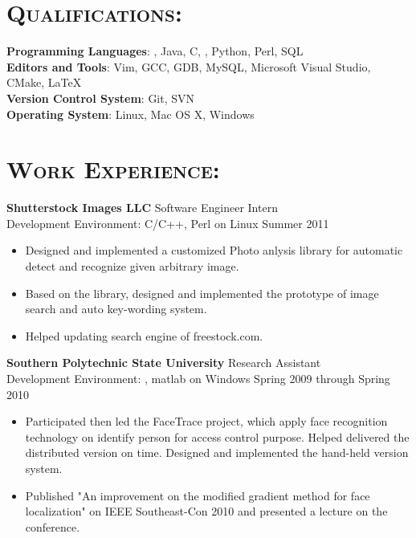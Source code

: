 \begin{resume}
\section{\textsc{Qualifications:}}

\textbf{\newline Programming Languages}: \Cplusplus, Java, C, \CSharp, Python, Perl, SQL \\
\textbf{Editors and Tools}: Vim, GCC, GDB, MySQL, Microsoft Visual Studio, CMake, \LaTeX \\
\textbf{Version Control System}: Git, SVN \\
\textbf{Operating System}: Linux, Mac OS X, Windows 


\section{\textsc{Work Experience:}}
\textbf{\newline Shutterstock Images LLC} \hfill Software Engineer Intern\\
Development Environment: C/C++, Perl on Linux \hfill Summer 2011
\begin{itemize}
    \item Designed and implemented a customized Photo anlysis library for automatic detect and recognize given arbitrary image.
    \item Based on the library, designed and implemented the prototype of image search and auto key-wording system.
    \item Helped updating search engine of freestock.com.
\end{itemize}


\textbf{Southern Polytechnic State University} \hfill Research Assistant\\
Development Environment: \CSharp, matlab on Windows \hfill Spring 2009 through Spring 2010 
\begin{itemize}
 	\item Participated then led the FaceTrace project, which apply face recognition
technology on identify person for access control purpose.
Helped delivered the distributed version on time.
Designed and implemented the hand-held version system.    
    \item Published "An improvement on the
modified gradient method for face localization" on IEEE Southeast-Con 2010
and presented a lecture on the conference. 
\end{itemize}


\end{resume}
